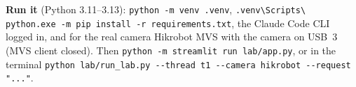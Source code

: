 \documentclass[11pt,a4paper]{article}
\begin{document}
\textbf{Run it} (Python 3.11--3.13): \texttt{python -m venv .venv}, \texttt{.venv\textbackslash Scripts\textbackslash
python.exe -m pip install -r requirements.txt}, the Claude Code CLI logged in, and for the real camera Hikrobot MVS with
the camera on USB~3 (MVS client closed). Then \texttt{python -m streamlit run lab/app.py}, or in the terminal
\texttt{python lab/run\_lab.py -{}-thread t1 -{}-camera hikrobot -{}-request "..."}.
\end{document}
